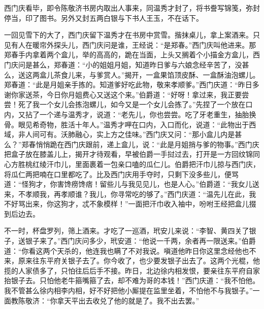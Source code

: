 西门庆看毕，即令陈敬济书房内取出人事来，同温秀才封了，将书誊写锦笺，弥封停当，印了图书。另外又封五两白银与下书人王玉，不在话下。

一回见雪下的大了，西门庆留下温秀才在书房中赏雪。揩抹桌儿，拿上案酒来。只见有人在暖帘外探头儿，西门庆问是谁，王经说：“是郑春。”西门庆叫他进来。那郑春手内拿着两个盒儿，举的高高的，跪在当面，上头又搁着个小描金方盒儿，西门庆问是甚么，郑春道：“小的姐姐月姐，知道昨日爹与六娘念经辛苦了，没甚么，送这两盒儿茶食儿来，与爹赏人。”揭开，一盒果馅顶皮酥、一盒酥油泡螺儿。郑春道：“此是月姐亲手拣的。知道爹好吃此物，敬来孝顺爹。”西门庆道：“昨日多谢你家送茶，今日你月姐费心又送这个来。”伯爵道：“好呀！拿过来，我正要尝尝！死了我一个女儿会拣泡螺儿，如今又是一个女儿会拣了。”先捏了一个放在口内，又拈了一个递与温秀才，说道：“老先儿，你也尝尝。吃了牙老重生，抽胎换骨。眼见希奇物，胜活十年人。”温秀才呷在口内，入口而化，说道：“此物出于西域，非人间可有。沃肺融心，实上方之佳味。”西门庆又问：“那小盒儿内是甚么？”郑春悄悄跪在西门庆跟前，递上盒儿，说：“此是月姐捎与爹的物事。”西门庆把盒子放在膝盖儿上，揭开才待观看，早被伯爵一手挝过去，打开是一方回纹锦同心方胜桃红绫汗巾儿，里面裹着一包亲口嗑的瓜仁儿。伯爵把汗巾儿掠与西门庆，将瓜仁两把喃在口里都吃了。比及西门庆用手夺时，只剩下没多些儿，便骂道：“怪狗才，你害馋痨馋痞！留些儿与我见见儿，也是人心。”伯爵道：“我女儿送来，不孝顺我，再孝顺谁？我儿，你寻常吃的够了。”西门庆道：“温先儿在此，我不好骂出来，你这狗才，忒不象模样！”一面把汗巾收入袖中，吩咐王经把盒儿掇到后边去。

不一时，杯盘罗列，筛上酒来。才吃了一巡酒，玳安儿来说：“李智、黄四关了银子，送银子来了。”西门庆问多少，玳安道：“他说一千两，余者再一限送来。”伯爵道：“你看这两个天杀的，他连我也瞒了不对我说。嗔道他昨日你这里念经他也不来，原来往东平府关银子去了。你今收了，也少要发银子出去了。这两个光棍，他揽的人家债多了，只怕往后后手不接。昨日，北边徐内相发恨，要亲往东平府自家抬银子去。只怕他老牛箍嘴箍了去，却不难为哥的本钱！”西门庆道：“我不怕他。我不管甚么徐内相李内相，好不好把他小厮提在监里坐着，不怕他不与我银子。”一面教陈敬济：“你拿天平出去收兑了他的就是了。我不出去罢。”

